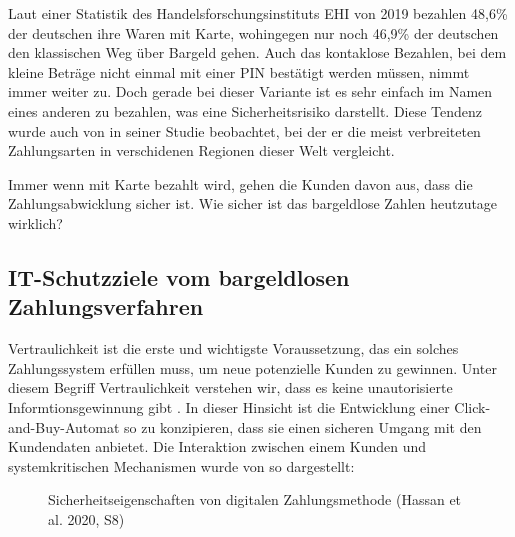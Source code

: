 Laut einer Statistik des Handelsforschungsinstituts EHI von 2019 \cite{refart:KSDL} bezahlen 48,6\% 
der deutschen ihre Waren mit Karte, wohingegen nur noch 46,9\% der deutschen den klassischen 
Weg über Bargeld gehen. Auch das kontaklose Bezahlen, bei dem kleine Beträge nicht einmal mit einer 
PIN bestätigt werden müssen, nimmt immer weiter zu. Doch gerade bei dieser Variante ist es sehr einfach
im Namen eines anderen zu bezahlen, was eine Sicherheitsrisiko darstellt. Diese Tendenz wurde auch
von \cite{refart:TDMP} in seiner Studie beobachtet, bei der er die meist verbreiteten Zahlungsarten
in verschidenen Regionen dieser Welt vergleicht. 


Immer wenn mit Karte bezahlt wird, gehen die Kunden davon aus, dass die Zahlungsabwicklung sicher ist. 
Wie sicher ist das bargeldlose Zahlen heutzutage wirklich? 


\subsection{IT-Schutzziele vom bargeldlosen Zahlungsverfahren}


Vertraulichkeit ist die erste und wichtigste Voraussetzung, das ein solches Zahlungssystem erfüllen muss, 
um neue potenzielle Kunden zu gewinnen. Unter diesem Begriff Vertraulichkeit verstehen wir, dass es keine 
unautorisierte Informtionsgewinnung gibt \cite{refbook:SWIS}.
In dieser Hinsicht ist die Entwicklung einer Click-and-Buy-Automat  so zu konzipieren, dass sie einen sicheren
Umgang mit den Kundendaten anbietet. Die Interaktion zwischen einem Kunden und systemkritischen Mechanismen 
wurde von \cite{refart:HARE} so dargestellt:

\vfill
\begin{figure}[htb]
    \caption{Sicherheitseigenschaften von digitalen Zahlungsmethode (Hassan et al. 2020, S8)}
    \label{fig:refark_HARE}
\end{figure}
\vfill

